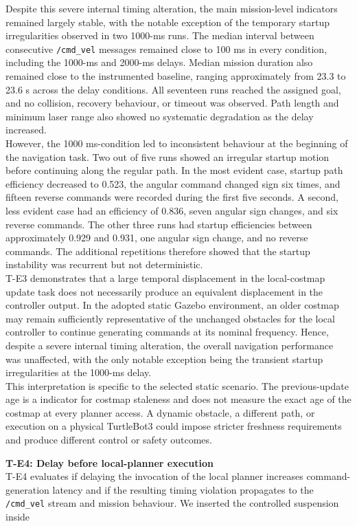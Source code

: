 Despite this severe internal timing alteration, the main mission-level indicators remained largely stable, with the notable exception of the temporary startup irregularities observed in two 1000-ms runs. The median interval between consecutive \texttt{/cmd\_vel} messages remained close to 100 ms in every condition, including the 1000-ms and 2000-ms delays. Median mission duration also remained close to the instrumented baseline, ranging approximately from 23.3 to 23.6 s across the delay conditions. All seventeen runs reached the assigned goal, and no collision, recovery behaviour, or timeout was observed. Path length and minimum laser range also showed no systematic degradation as the delay increased.
\\
However, the 1000 ms-condition led to inconsistent behaviour at the beginning of the navigation task. Two out of five runs showed an irregular startup motion before continuing along the regular path. In the most evident case, startup path efficiency decreased to 0.523, the angular command changed sign six times, and fifteen reverse commands were recorded during the first five seconds. A second, less evident case had an efficiency of 0.836, seven angular sign changes, and six reverse commands. The other three runs had startup efficiencies between approximately 0.929 and 0.931, one angular sign change, and no reverse commands. The additional repetitions therefore showed that the startup instability was recurrent but not deterministic.
\\
T-E3 demonstrates that a large temporal displacement in the local-costmap update task does not necessarily produce an equivalent displacement in the controller output. In the adopted static Gazebo environment, an older costmap may remain sufficiently representative of the unchanged obstacles for the local controller to continue generating commands at its nominal frequency. Hence, despite a severe internal timing alteration, the overall navigation performance was unaffected, with the only notable exception being the transient startup irregularities at the 1000-ms delay.
\\
This interpretation is specific to the selected static scenario. The previous-update age is a indicator for costmap staleness and does not measure the exact age of the costmap at every planner access. A dynamic obstacle, a different path, or execution on a physical TurtleBot3 could impose stricter freshness requirements and produce different control or safety outcomes.

\noindent \textbf{T-E4: Delay before local-planner execution}
\\
T-E4 evaluates if delaying the invocation of the local planner increases command-generation latency and if the resulting timing violation propagates to the \texttt{/cmd\_vel} stream and mission behaviour. We inserted the controlled suspension inside 

